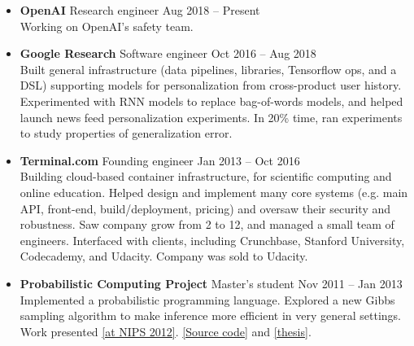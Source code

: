 \documentclass[11 pt]{article}
\begin{document}
\begin{itemize}

\item \textbf{OpenAI} Research engineer \hfill Aug 2018 -- Present \\
  Working on OpenAI's safety team.


\item \textbf{Google Research} Software engineer \hfill Oct 2016 -- Aug 2018 \\
Built general infrastructure (data pipelines, libraries, Tensorflow ops, and a DSL) supporting models for personalization from cross-product user history.
Experimented with RNN models to replace bag-of-words models, and helped launch news feed personalization experiments.
In 20\% time, ran experiments to study properties of generalization error.

\item \textbf{Terminal.com} Founding engineer \hfill Jan 2013 -- Oct 2016 \\
Building cloud-based container infrastructure, for scientific computing and online education.
Helped design and implement many core systems (e.g. main API, front-end, build/deployment, pricing) %
and oversaw their security and robustness.
Saw company grow from 2 to 12, and managed a small team of engineers.
Interfaced with clients, including Crunchbase, Stanford University, Codecademy, and Udacity.
Company was sold to Udacity.

\item \textbf{Probabilistic Computing Project} Master's student \hfill Nov 2011 -- Jan 2013 \\
Implemented a probabilistic programming language.
Explored a new Gibbs sampling algorithm to make inference more efficient in very general settings.
Work presented \href{http://probabilistic-programming.org/wiki/NIPS*2012_Workshop/Schedule#poster-wu}{[at NIPS 2012]}.
\href{https://github.com/WuTheFWasThat/PyChurch.}{[Source code]}
and
\href{https://github.com/WuTheFWasThat/PyChurch/blob/master/papers/MEng\%20thesis.pdf}{[thesis]}.




\end{itemize}
\end{document}
